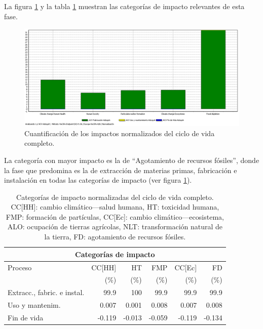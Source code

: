 La figura \ref{fig:completo_normalizacion} y la tabla \ref{categoriasimpactocompleto} muestran las categorías de impacto relevantes de esta fase.

\begin{figure}[!htb]
\centering
\includegraphics[width=15cm]{img/completo_normalizacion.png}
\caption{Cuantificación de los impactos normalizados del ciclo de vida completo.}
\label{fig:completo_normalizacion}
\end{figure}

La categoría con mayor impacto es la de ``Agotamiento de recursos fósiles'', donde la fase que predomina es la de extracción de materias primas, fabricación e instalación en todas las categorías de impacto (ver figura \ref{fig:completo_normalizacion}).

\begin{table}[!htb]
\centering
\begin{tabular}{p{4cm}rrrrr}
\toprule
\multicolumn{6}{c}{Categorías de impacto}\\
\midrule
Proceso & CC[HH] & HT & FMP & CC[Ec] & FD\\
 &  (\%) & (\%) & (\%) & (\%) & (\%)\\
\midrule
Extracc., fabric. e instal. & 99.9 & 100 & 99.9 & 99.9 & 99.9\\
Uso y mantenim. & 0.007 & 0.001 & 0.008 & 0.007 & 0.008\\
Fin de vida & -0.119 & -0.013 & -0.059 & -0.119 & -0.134\\
\bottomrule
\end{tabular}
\caption[Categorías de impacto normalizadas del ciclo de vida completo..]{Categorías de impacto normalizadas del ciclo de vida completo. CC[HH]: cambio climático—salud humana, HT: toxicidad humana, FMP: formación de partículas, CC[Ec]: cambio climático—ecosistema, ALO: ocupación de tierras agrícolas, NLT: transformación natural de la tierra, FD: agotamiento de recursos fósiles.}
\label{categoriasimpactocompleto}
\end{table}

